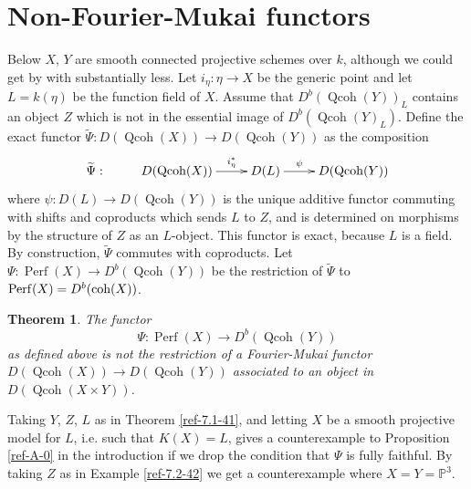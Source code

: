 \documentclass{amsart}
\numberwithin{equation}{section}
\let\blb\mathbb
\newtheorem{theorem}[lemma]{Theorem}
\theoremstyle{definition}
\theoremstyle{remark}
\begin{document}
\section{Non-Fourier-Mukai functors}
Below $X$, $Y$ are smooth connected projective schemes over $k$, although we could get by with substantially less.
Let $i_\eta:\eta{\rightarrow} X$ be the generic point and let $L=k(\eta)$ be the function field of $X$. Assume that
$D^b({\operatorname{Qcoh}}(Y))_L$ contains an object $Z$ which is not in the essential image of $D^b({\operatorname{Qcoh}}(Y)_L)$. Define
the exact functor $\widetilde{\Psi} : D({\operatorname{Qcoh}}(X)){\rightarrow} D({\operatorname{Qcoh}}(Y))$ as the composition
\[
\xymatrix{
\widetilde{\Psi}:& D({\operatorname{Qcoh}}(X)) \ar[r]^-{i^*_{\eta}} &  D(L) \ar[r]^-{\psi} & D({\operatorname{Qcoh}}(Y))
}
\]
where $\psi:D(L) \xrightarrow{} D({\operatorname{Qcoh}}(Y))$
 is the unique additive functor commuting with shifts and coproducts
which sends $L$ to $Z$, and is determined on morphisms by the structure of $Z$ as an $L$-object. This functor is exact, because $L$ is a field. 
By construction, $\tilde{\Psi}$ commutes with coproducts.
Let $\Psi:{\operatorname{Perf}}(X){\rightarrow} D^b({\operatorname{Qcoh}}(Y))$ be the restriction of $\widetilde{\Psi}$ to ${\operatorname{Perf}}(X)=D^b({\mathop{\text{\upshape{coh}}}}(X))$. 
\begin{theorem} \label{ref-8.1-43}
The functor
\[
\Psi:{\operatorname{Perf}}(X){\rightarrow} D^b({\operatorname{Qcoh}}(Y))
\]
as defined above is not the restriction of a Fourier-Mukai functor $D({\operatorname{Qcoh}}(X)){\rightarrow} D({\operatorname{Qcoh}}(Y))$ associated
to an object in $D({\operatorname{Qcoh}}(X\times Y))$.
\end{theorem}
Taking $Y$, $Z$, $L$ as in Theorem \ref{ref-7.1-41}, and letting $X$ be a smooth projective model for $L$, i.e. such that $K(X)=L$, gives a counterexample to Proposition \ref{ref-A-0} in the introduction
if we drop the condition that $\Psi$ is fully faithful. By taking $Z$ as in Example \ref{ref-7.2-42} we get a counterexample where $X=Y={{\blb P}}^3$.

\medskip
\end{document}
